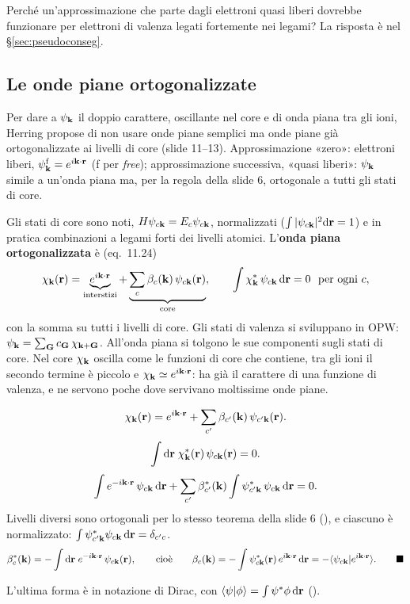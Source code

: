 \documentclass[11pt,a4paper]{article}
\begin{document}
Perché un'approssimazione che parte dagli elettroni quasi liberi dovrebbe funzionare per elettroni di valenza legati fortemente nei legami? La
risposta è nel §\ref{sec:pseudoconseg}.

\subsection{Le onde piane ortogonalizzate}\label{sec:opw}
Per dare a $\psi_{\mathbf k}$ il doppio carattere, oscillante nel core e di onda piana tra gli ioni, Herring propose di non usare onde piane semplici ma
onde piane già ortogonalizzate ai livelli di core (slide 11--13). Approssimazione «zero»: elettroni liberi, $\psi^{\mathrm f}_{\mathbf k}=e^{i\mathbf k\cdot\mathbf r}$
(f per \emph{free}); approssimazione successiva, «quasi liberi»: $\psi_{\mathbf k}$ simile a un'onda piana ma, per la regola della slide 6, ortogonale a tutti
gli stati di core.

\begin{modello}\label{mod:opw}
Gli stati di core sono noti, $H\psi_{c\mathbf k}=E_c\psi_{c\mathbf k}$, normalizzati ($\int|\psi_{c\mathbf k}|^2\mathrm d\mathbf r=1$) e in pratica combinazioni a legami forti dei
livelli atomici. L'\textbf{onda piana ortogonalizzata}  è (eq.~11.24)
\[
\chi_{\mathbf k}(\mathbf r)=\underbrace{e^{i\mathbf k\cdot\mathbf r}}_{\text{interstizi}}+\underbrace{\sum_c\beta_c(\mathbf k)\,\psi_{c\mathbf k}(\mathbf r)}_{\text{core}},\qquad
\int\chi_{\mathbf k}^*\,\psi_{c\mathbf k}\,\mathrm d\mathbf r=0\ \ \text{per ogni }c,
\]
con la somma su tutti i livelli di core. Gli stati di valenza si sviluppano in OPW:
$\psi_{\mathbf k}=\sum_{\mathbf G}c_{\mathbf G}\,\chi_{\mathbf k+\mathbf G}$.
\tcblower
All'onda piana si tolgono le sue componenti sugli stati di core. Nel core $\chi_{\mathbf k}$ oscilla come le funzioni di core che contiene, tra gli ioni il
secondo termine è piccolo e $\chi_{\mathbf k}\simeq e^{i\mathbf k\cdot\mathbf r}$: ha già il carattere di una funzione di valenza, e ne servono poche dove servivano
moltissime onde piane.
\end{modello}

\begin{dimostrazione}
\[
\chi_{\mathbf k}(\mathbf r)=e^{i\mathbf k\cdot\mathbf r}+\sum_{c'}\beta_{c'}(\mathbf k)\,\psi_{c'\mathbf k}(\mathbf r).
\]
\[
\int\mathrm d\mathbf r\;\chi_{\mathbf k}^*(\mathbf r)\,\psi_{c\mathbf k}(\mathbf r)=0 .
\]
\[
\int e^{-i\mathbf k\cdot\mathbf r}\,\psi_{c\mathbf k}\,\mathrm d\mathbf r+\sum_{c'}\beta_{c'}^*(\mathbf k)\int\psi^*_{c'\mathbf k}\,\psi_{c\mathbf k}\,\mathrm d\mathbf r=0 .
\]
Livelli diversi sono ortogonali per lo stesso teorema della slide 6 (), e ciascuno è normalizzato:
$\int\psi^*_{c'\mathbf k}\psi_{c\mathbf k}\,\mathrm d\mathbf r=\delta_{c'c}$.
\[
\beta_c^*(\vk)=-\int\dd\vr\;e^{-i\vk\cdot\vr}\,\psi_{c\vk}(\vr),\qquad\text{cioè}\qquad
\beta_c(\vk)=-\int\psi^*_{c\vk}(\vr)\,e^{i\vk\cdot\vr}\,\dd\vr=-\langle\psi_{c\vk}|e^{i\vk\cdot\vr}\rangle .\qed
\]
\end{dimostrazione}
L'ultima forma è in notazione di Dirac, con $\langle\psi|\phi\rangle=\int\psi^*\phi\,\mathrm d\mathbf r$ ().
\end{document}
